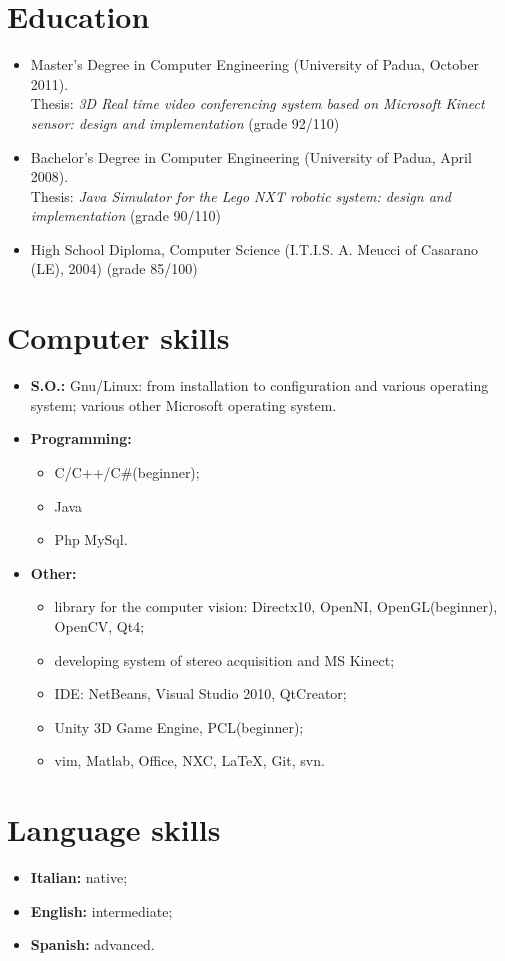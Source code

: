 \documentclass[pdftex,a4paper,10pt,twoside,titlepage]{article}
\begin{document}
\section*{Education}
\begin{itemize}
	\item Master's Degree in Computer Engineering (University of Padua, October 2011).\\
	Thesis: {\itshape 3D Real time video conferencing system based on Microsoft Kinect sensor: design and implementation } (grade 92/110)
	\item Bachelor's Degree in Computer Engineering (University of Padua, April 2008). \\Thesis:
	{\itshape Java Simulator for the Lego NXT robotic system: design and implementation} (grade 90/110)
	\item High School Diploma, Computer Science  (I.T.I.S. A. Meucci of Casarano (LE), 2004) (grade 85/100)
\end{itemize}

\section*{Computer skills}
\begin{itemize}
	\item \textbf{S.O.:} Gnu/Linux: from installation to configuration and various operating system; various other Microsoft operating system.
	\item \textbf{Programming:} 
	\begin{itemize}
	\item C/C++/C\#(beginner);
	\item Java
	\item Php MySql.
	\end{itemize}
	\item \textbf{Other:}
	\begin{itemize}
	\item library for the computer vision: Directx10, OpenNI, OpenGL(beginner), OpenCV, Qt4;
	\item developing system of stereo acquisition and MS Kinect;
	\item IDE: NetBeans, Visual Studio 2010, QtCreator;
	\item Unity 3D Game Engine, PCL(beginner);
	\item vim, Matlab, Office, NXC, \LaTeX, Git, svn.
	\end{itemize}
\end{itemize}
\section*{Language skills}
\begin{itemize}
	\item \textbf{Italian:} native;
	\item \textbf{English:} intermediate;
	\item \textbf{Spanish:} advanced.
\end{itemize}
\end{document}
